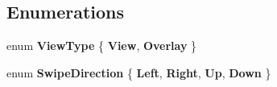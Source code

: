 \subsection*{Enumerations}
\begin{DoxyCompactItemize}
\item 
\hypertarget{namespace_scaffolding_adc0bcef3c1b102a3c533746548b926bc}{enum {\bfseries View\+Type} \{ {\bfseries View}, 
{\bfseries Overlay}
 \}}\label{namespace_scaffolding_adc0bcef3c1b102a3c533746548b926bc}

\item 
\hypertarget{namespace_scaffolding_ac802e1dd73864be73491e27ad8d59017}{enum {\bfseries Swipe\+Direction} \{ {\bfseries Left}, 
{\bfseries Right}, 
{\bfseries Up}, 
{\bfseries Down}
 \}}\label{namespace_scaffolding_ac802e1dd73864be73491e27ad8d59017}

\end{DoxyCompactItemize}
